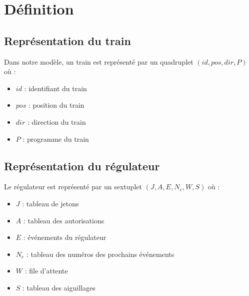 \documentclass[12pt]{article}
\begin{document}
\newcommand\ruleCrash[2]{ %
    \inferrule
        {#1 \neq #2}
        {\Gamma, \train{#1}{pos}{dir}{P}, \train{#2}{pos}{dir'}{P'}  \Rightarrow \bot}
}

\newcommand\ruleCrashSec[3]{ %
    \inferrule
        {\lnot suiv(#2, #3) = \emptyset \\ #3 \neq * \\ R.A[#1] \neq #2}
        {\trainfull{#1}{#2}{#3}{P}, R \Rightarrow \bot}
}


\maketitle


\section{Définition}

\subsection{Représentation du train}
Dans notre modèle, un train est représenté par un quadruplet $(id, pos, dir, P)$ où :
\begin{itemize}
    \item $id$ : identifiant du train
    \item $pos$ : position du train 
    \item $dir$ : direction du train
    \item $P$ : programme du train
\end{itemize}

\subsection{Représentation du régulateur}
Le régulateur est représenté par un sextuplet $(J, A, E, N_e, W, S)$ où :
\begin{itemize}
    \item $J$ : tableau de jetons
    \item $A$ : tableau des autorisations
    \item $E$ : événements du régulateur
    \item $N_e$ : tableau des numéros des prochains événements
    \item $W$ : file d'attente
    \item $S$ : tableau des aiguillages
\end{itemize}
\end{document}
